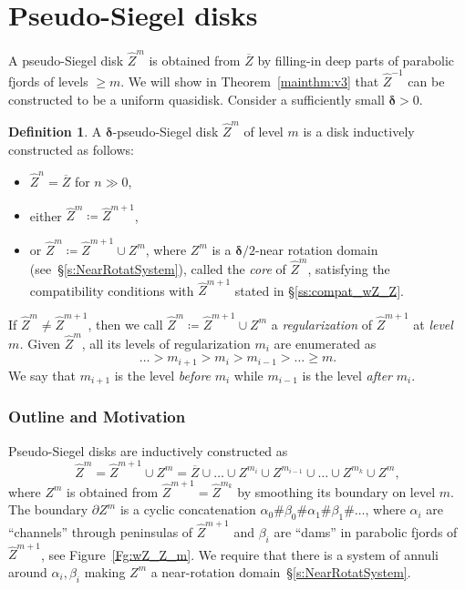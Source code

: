 \documentclass{amsart}
\newcommand{\1}{{\mathbb 1 }}
\newcommand{\wZ}{{\widehat Z}}
\theoremstyle{remark}
\numberwithin{equation}{section}
\theoremstyle{definition}
\newtheorem{defn}[thm]{Definition}
\newcommand{\bdelta}{{\boldsymbol{ \delta}}}
\begin{document}
\section{Pseudo-Siegel disks} 
\label{s:wZ^m}

A pseudo-Siegel disk $\widehat Z^m$ is obtained from $\overline Z$ by filling-in  deep parts of parabolic fjords of levels $\ge m$. We will show in Theorem~\ref{mainthm:v3} that $\widehat Z^{-1}$ can be constructed to be a  uniform quasidisk. Consider a sufficiently small $\bdelta>0$.  

\begin{defn}
\label{dfn:PseudoSiegDisk}
A $\bdelta$-pseudo-Siegel disk $\widehat Z^m$ of level $m$ is a disk inductively constructed as follows:

\begin{itemize}
\item $\widehat Z^n=\overline Z$ for $n\gg 0$,
\item either $\widehat Z^m\coloneqq \widehat Z^{m+1}$, 
\item or $\widehat Z^m\coloneqq \widehat Z^{m+1}\cup Z^m$, where $Z^m$ is a $\bdelta/2$-near rotation domain (see~\S\ref{s:NearRotatSystem}), called the \emph{core} of $\widehat Z^m$, satisfying the compatibility conditions with $\widehat Z^{m+1}$ stated in \S\ref{ss:compat_wZ_Z}.
\end{itemize}
\end{defn}

If $\widehat Z^m\not= \widehat Z^{m+1}$, then we call $\widehat Z^m\coloneqq \widehat Z^{m+1}\cup Z^m$ a \emph{regularization} of $\wZ^{m+1}$ at \emph{level $m$.} Given $\wZ^m$, all its levels of regularization $m_i$ are enumerated as \[\dots>m_{i+1}>m_i>m_{i-1}>\dots \ge m.\] 
We say that $m_{i+1}$ is the level \emph{before} $m_i$ while $m_{i-1}$ is the level \emph{after} $m_i$. 


\subsubsection{Outline and Motivation}
\label{sss:outline:s:Trad W to W+} Pseudo-Siegel disks are inductively constructed as \[\wZ^m= \wZ^{m+1} \cup Z^m=\overline Z\cup \dots\cup Z^{m_i} \cup  Z^{m_{i-1}} \cup \dots\cup Z^{m_k} \cup Z^m, 
\] where $Z^{m}$ is obtained from $\wZ^{m+1}=\wZ^{m_k}$ by smoothing its boundary on level $m$. The boundary $\partial Z^m$ is a cyclic concatenation $\alpha_0\#\beta_0\#\alpha_1\#\beta_1\#\dots$, where $\alpha_i$ are ``channels'' through peninsulas of $\wZ^{m+1}$ and $\beta_i$ are ``dams'' in parabolic fjords of $\wZ^{m+1}$, see Figure~\ref{Fg:wZ_Z_m}. We require that there is a system of annuli around $\alpha_i, \beta_i$ making $Z^m$ a near-rotation domain~\S\ref{s:NearRotatSystem}. 
\end{document}
